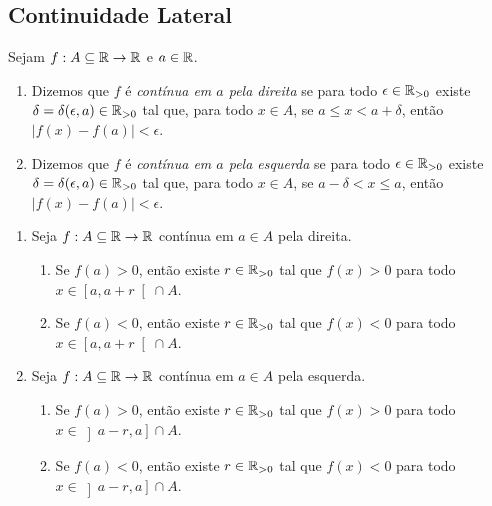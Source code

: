 \subsection{Continuidade Lateral}

\begin{definition}
    Sejam $f: A \subseteq \mathbb{R} \to \mathbb{R}$ e $a \in \mathbb{R}$.
        \begin{enumerate}[leftmargin=*, align=left, label=\textbf{(\alph*)}]
            \item Dizemos que $f$ é \emph{contínua em $a$ pela direita} se para todo $\epsilon \in \mathbb{R}_{>0}$ existe $\delta = \delta(\epsilon,a) \in \mathbb{R}_{>0}$ tal que, para todo $x \in A$, se $a \leq x < a+\delta$, então $|f(x) - f(a)| < \epsilon$.
            \item Dizemos que $f$ é \emph{contínua em $a$ pela esquerda} se para todo $\epsilon \in \mathbb{R}_{>0}$ existe $\delta = \delta(\epsilon,a) \in \mathbb{R}_{>0}$ tal que, para todo $x \in A$, se $a - \delta < x \leq a$, então $|f(x) - f(a)| < \epsilon$.
        \end{enumerate}
\end{definition}

\begin{proposition} \label{prop.calc1:con_sin_cont_lat}
    \leavevmode
        \begin{enumerate}[leftmargin=*, align=left, label=\textbf{(\alph*)}]
            \item Seja $f : A \subseteq \mathbb{R} \to \mathbb{R}$ contínua em $a \in A$ pela direita.
                \begin{enumerate}[label=\roman*.]
                    \item Se $f(a) > 0$, então existe $r \in \mathbb{R}_{>0}$ tal que $f(x) > 0$ para todo $x \in \left[ a, a+r \right[ \cap A$.
                    \item Se $f(a) < 0$, então existe $r \in \mathbb{R}_{>0}$ tal que $f(x) < 0$ para todo $x \in \left[ a, a+r \right[ \cap A$.
                \end{enumerate}
            \item Seja $f : A \subseteq \mathbb{R} \to \mathbb{R}$ contínua em $a \in A$ pela esquerda.
                \begin{enumerate}[label=\roman*.]
                    \item Se $f(a) > 0$, então existe $r \in \mathbb{R}_{>0}$ tal que $f(x) > 0$ para todo $x \in \left]a-r, a \right] \cap A$.
                    \item Se $f(a) < 0$, então existe $r \in \mathbb{R}_{>0}$ tal que $f(x) < 0$ para todo $x \in \left]a-r, a \right] \cap A$.
                \end{enumerate}
        \end{enumerate}
\end{proposition}

